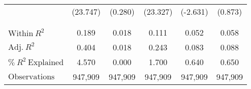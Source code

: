 \begin{xltabular}{\linewidth}{X * {5}{S[table-format=4.3]}}
 & (23.747) & (0.280) & (23.327) & (-2.631) & (0.873)\\
 &  &  &  &  \vphantom{1} & \\
\midrule
 &  &  &  &  & \\
$\textrm{Within} \: R^2$ & {0.189} & {0.018} & {0.111} & {0.052} & {0.058}\\
$\textrm{Adj.} \: R^2$ & {0.404} & {0.018} & {0.243} & {0.083} & {0.088}\\
\addlinespace
$\% \: R^2 \: \textrm{Explained}$ & {4.570} & {0.000} & {1.700} & {0.640} & {0.650}\\
$\textrm{Observations}$ & {947,909} & {947,909} & {947,909} & {947,909} & {947,909}\\*
\end{xltabular}
\restoregeometry

\endgroup{}
